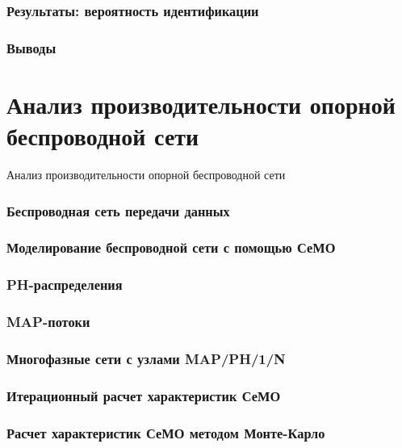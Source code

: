 \begin{frame}
    \frametitle{Результаты: вероятность идентификации}
\end{frame}

\begin{frame}
    \frametitle{Выводы}
\end{frame}





\section{Анализ производительности опорной беспроводной сети}
\begin{frame}
    \begin{center}
        \Huge
        Анализ производительности опорной беспроводной сети
    \end{center}
\end{frame}

\begin{frame}
    \frametitle{Беспроводная сеть передачи данных}
\end{frame}

\begin{frame}
    \frametitle{Моделирование беспроводной сети с помощью СеМО}
\end{frame}

\begin{frame}
    \frametitle{PH-распределения}
\end{frame}

\begin{frame}
    \frametitle{MAP-потоки}
\end{frame}

\begin{frame}
    \frametitle{Многофазные сети с узлами MAP/PH/1/N}
\end{frame}

\begin{frame}
    \frametitle{Итерационный расчет характеристик СеМО}
\end{frame}

\begin{frame}
    \frametitle{Расчет характеристик СеМО методом Монте-Карло}
\end{frame}

